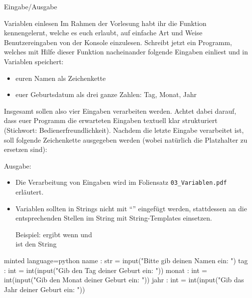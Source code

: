 \begin{task}[points=auto]{Eingabe/Ausgabe }
    \begin{subtask*}[points=0]{Variablen einlesen}
        Im Rahmen der Vorlesung habt ihr die Funktion  kennengelernt, welche es euch erlaubt, auf einfache Art und Weise Benutzereingaben von der Konsole einzulesen. Schreibt jetzt ein Programm, welches mit Hilfe dieser Funktion nacheinander folgende Eingaben einliest und in Variablen speichert:
        \begin{itemize}
            \item euren Namen als Zeichenkette
            \item euer Geburtsdatum als drei ganze Zahlen: Tag, Monat, Jahr
        \end{itemize}
        Insgesamt sollen also vier Eingaben verarbeiten werden. Achtet dabei darauf, dass euer Programm die erwarteten Eingaben textuell klar strukturiert (Stichwort: Bedienerfreundlichkeit).
        Nachdem die letzte Eingabe verarbeitet ist, soll folgende Zeichenkette ausgegeben werden (wobei natürlich die Platzhalter zu ersetzen sind):

        Ausgabe: 

        \begin{hinweise}
            \begin{itemize}
                \item Die Verarbeitung von Eingaben wird im Foliensatz \verb+03_Variablen.pdf+ erläutert.
                \item Variablen sollten in Strings nicht mit \enquote{\pythoninline{+}} eingefügt werden, stattdessen an die entsprechenden Stellen im String mit String-Templates einsetzen.

                    Beispiel:  ergibt wenn  und\\
                     ist den String 
            \end{itemize}
        \end{hinweise}

        \begin{solution}
            \begin{codeBlock}[]{minted language=python}
                name : str = input("Bitte gib deinen Namen ein: ")
                tag : int = int(input("Gib den Tag deiner Geburt ein: "))
                monat : int = int(input("Gib den Monat deiner Geburt ein: "))
                jahr : int = int(input("Gib das Jahr deiner Geburt ein: "))


\end{codeBlock}
\end{solution}
\end{subtask*}
\end{task}
